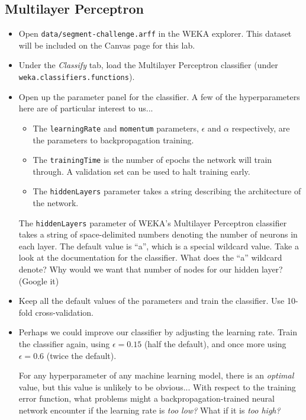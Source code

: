 \documentclass[11pt]{cselabheader}
\begin{document}
\subsection{Multilayer Perceptron}
\begin{itemize}[leftmargin=*]
  \item Open \texttt{data/segment-challenge.arff} in the WEKA explorer. This dataset will be included on the Canvas page for this lab.

  \item Under the \emph{Classify} tab, load the Multilayer Perceptron classifier (under \texttt{weka.classifiers.functions}).

  \item Open up the parameter panel for the classifier. A few of the hyperparameters here are of particular interest to us...
  \begin{itemize}[leftmargin=*]
    \item The \texttt{learningRate} and \texttt{momentum} parameters, $\epsilon$ and $\alpha$ respectively, are the parameters to backpropagation training.
    \item The \texttt{trainingTime} is the number of epochs the network will train through. A validation set can be used to halt training early.
    \item The \texttt{hiddenLayers} parameter takes a string describing the architecture of the network.
  \end{itemize}
  
  \begin{ex}
    The \texttt{hiddenLayers} parameter of WEKA's Multilayer Perceptron classifier takes a string of space-delimited numbers denoting the number of neurons in each layer. The default value is ``a'', which is a special wildcard value. Take a look at the documentation for the classifier. What does the ``a'' wildcard denote? Why would we want that number of nodes for our hidden layer? (Google it)
  \end{ex}

  \item Keep all the default values of the parameters and train the classifier. Use 10-fold cross-validation.

  \item Perhaps we could improve our classifier by adjusting the learning rate. Train the classifier again, using $\epsilon=0.15$ (half the default), and once more using $\epsilon=0.6$ (twice the default).

  \begin{ex}
    For any hyperparameter of any machine learning model, there is an \emph{optimal} value, but this value is unlikely to be obvious... With respect to the training error function, what problems might a backpropagation-trained neural network encounter if the learning rate is \emph{too low?} What if it is \emph{too high?}
  \end{ex}

\end{itemize}
\end{document}
